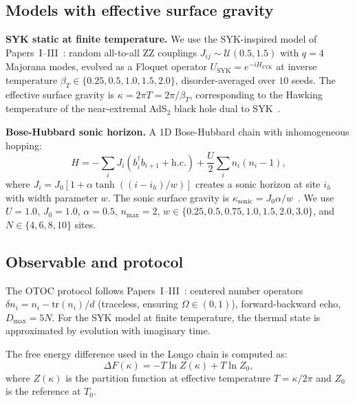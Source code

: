 \documentclass[aps,prl,twocolumn,superscriptaddress,showpacs]{revtex4-2}
\newcommand{\SYK}{\mathrm{SYK}}
\begin{document}
\subsection{Models with effective surface gravity}

\textbf{SYK static at finite temperature.}
We use the SYK-inspired model of Papers~I--III~\cite{PerezEugenio2026a}:
random all-to-all ZZ couplings $J_{ij} \sim \mathcal{U}(0.5, 1.5)$ with
$q=4$ Majorana modes, evolved as a Floquet operator $U_\SYK = e^{-iH_\SYK}$
at inverse temperature $\beta_T \in \{0.25, 0.5, 1.0, 1.5, 2.0\}$,
disorder-averaged over $10$ seeds. The effective surface gravity is
$\kappa = 2\pi T = 2\pi/\beta_T$, corresponding to the Hawking temperature
of the near-extremal AdS$_2$ black hole dual to SYK~\cite{Maldacena2016,
Kitaev2015}.

\textbf{Bose-Hubbard sonic horizon.}
A 1D Bose-Hubbard chain with inhomogeneous hopping:
\begin{equation}
H = -\sum_i J_i(b^\dagger_i b_{i+1} + \mathrm{h.c.})
    + \frac{U}{2}\sum_i n_i(n_i-1),
\label{eq:BH}
\end{equation}
where $J_i = J_0[1 + \alpha\tanh((i-i_h)/w)]$ creates a sonic horizon at
site $i_h$ with width parameter $w$. The sonic surface gravity is
$\kappa_\mathrm{sonic} = J_0\alpha/w$~\cite{Jacobson1991}. We use
$U = 1.0$, $J_0 = 1.0$, $\alpha = 0.5$, $n_\mathrm{max} = 2$,
$w \in \{0.25, 0.5, 0.75, 1.0, 1.5, 2.0, 3.0\}$, and
$N \in \{4, 6, 8, 10\}$ sites.

\subsection{Observable and protocol}

The OTOC protocol follows Papers~I--III~\cite{PerezEugenio2026a,
PerezEugenio2026b}: centered number operators $\delta n_i = n_i -
\mathrm{tr}(n_i)/d$ (traceless, ensuring $\Omega \in (0,1)$), forward-backward
echo, $D_\mathrm{max} = 5N$. For the SYK model at finite temperature,
the thermal state is approximated by evolution with imaginary time.

The free energy difference used in the Longo chain is computed as:
\begin{equation}
\Delta F(\kappa) = -T\ln Z(\kappa) + T\ln Z_0,
\label{eq:deltaF}
\end{equation}
where $Z(\kappa)$ is the partition function at effective temperature
$T = \kappa/2\pi$ and $Z_0$ is the reference at $T_0$.

\end{document}
